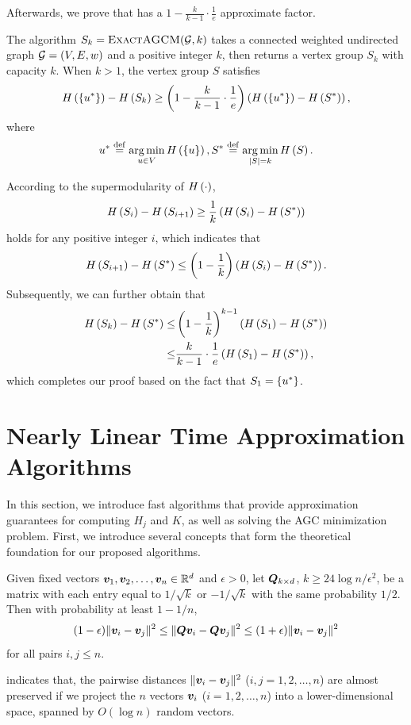 \documentclass[journal]{IEEEtran}
\begin{document}
Afterwards, we prove that  has a \(1-\frac{k}{k-1}\cdot\frac{1}{e}\) approximate factor.
\begin{theorem}
    The algorithm \(S_k=\textsc{ExactAGCM}(\mathcal{G},k)\) takes a connected weighted undirected graph \(\mathcal{G}=(V,E,w)\) and a positive integer \(k\), then returns a vertex group \(S_k\) with capacity \(k\).
    When \(k>1\), the vertex group \(S\) satisfies
    \[H\left(\left\{u^* \right\}\right)-H\left(S_k\right)\ge\left( 1-\frac{k}{k-1}\cdot\frac{1}{e} \right)\left( H\left(\left\{u^* \right\}\right)-H\left(S^*\right) \right),\]
    where
    \[u^*\stackrel{\mathrm{def}}{=}\operatorname*{arg\,min}_{u\in V}H\left(\left\{u \right\}\right),S^*\stackrel{\mathrm{def}}{=}\operatorname*{arg\,min}_{\left|S \right|=k}H\left(S\right).\]
\end{theorem}
\begin{IEEEproof}
    According to the supermodularity of \(H\left(\cdot\right)\),
    \[H\left(S_i\right)-H\left(S_{i+1}\right)\ge\frac{1}{k}\left( H\left(S_i\right)-H\left(S^*\right) \right)\]
    holds for any positive integer \(i\), which indicates that
    \[H\left(S_{i+1}\right)-H\left(S^*\right)\le\left( 1-\frac{1}{k} \right)\left( H\left(S_i\right)-H\left(S^*\right) \right).\]
    Subsequently, we can further obtain that
    \begin{align*}
        H\left(S_k\right)-H\left(S^*\right)\le & \left( 1-\frac{1}{k} \right)^{k-1}\left( H\left(S_1\right)-H\left(S^*\right) \right)    \\
        \le                      & \frac{k}{k-1}\cdot\frac{1}{e}\left( H\left(S_1\right)-H\left(S^*\right) \right),
    \end{align*}
    which completes our proof based on the fact that \(S_1=\left\{u^* \right\}\).
\end{IEEEproof}

\section{Nearly Linear Time Approximation Algorithms}\label{sec:approx-algo}

In this section, we introduce fast algorithms that provide approximation guarantees for computing \(H_j\) and \(K\), as well as solving the AGC minimization problem.
First, we introduce several concepts that form the theoretical foundation for our proposed algorithms.

\begin{lemma}
    \label{lemma:JL}
    Given fixed vectors \(\boldsymbol{v}_1,\boldsymbol{v}_2,\ldots,\boldsymbol{v}_n\in \mathbb{R}^d\) and
    \(\epsilon>0\), let
    \(\boldsymbol{Q}_{k\times d}\),  \(k\ge 24\log n/\epsilon^2\), be a matrix with each  entry equal  to \(1/\sqrt{k}\) or \(- 1/\sqrt{k}\)  with the same probability \(1/2\). Then with probability at least \(1-1/n\),
    \[(1-\epsilon)\|\boldsymbol{v}_i-\boldsymbol{v}_j\|^2\le \|\boldsymbol{Q} \boldsymbol{v}_i-\boldsymbol{Q} \boldsymbol{v}_j\|^2\le
        (1+\epsilon)\|\boldsymbol{v}_i-\boldsymbol{v}_j\|^2\] for all pairs \(i,j\le n\).
\end{lemma}
 indicates that,  the pairwise distances \(\|\boldsymbol{v}_i-\boldsymbol{v}_j\|^2\) (\(i,j=1,2,\ldots, n\)) are almost preserved if we project the \(n\) vectors \(\boldsymbol{v}_i\) (\(i=1,2,\ldots, n\))  into a lower-dimensional space, spanned
by \(O(\log n)\) random vectors.
\end{document}
